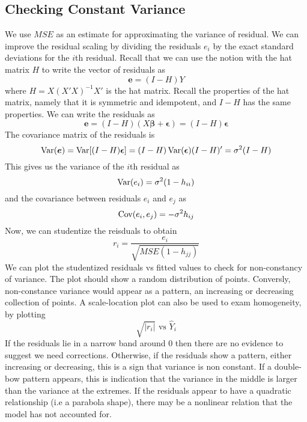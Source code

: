 \subsection{Checking Constant Variance}

We use $MSE$ as an estimate for approximating the variance of residual. We can improve the residual scaling by dividing the residuals $e_i$ by the exact standard deviations for the $i$th residual. Recall that we can use the notion with the hat matrix $H$ to write the vector of residuals as 
\[\boldsymbol{e} = (I-H)Y\]
where $H = X(X'X)^{-1}X'$ is the hat matrix. Recall the properties of the hat matrix, namely that it is symmetric and idempotent, and $I-H$ has the same properties. We can write the residuals as 
\[\boldsymbol{e} = (I-H)(X\boldsymbol{\beta} + \boldsymbol{\epsilon}) = (I-H)\boldsymbol{\epsilon}\]
The covariance matrix of the residuals is 
\[\operatorname{Var}(\boldsymbol{e}) = \operatorname{Var}[(I-H)\boldsymbol{\epsilon}] = (I-H)\operatorname{Var}(\boldsymbol{\epsilon})(I-H)' = \sigma^2(I-H)\]
This gives us the variance of the $i$th residual as
\[\operatorname{Var}(e_i) = \sigma^2(1-h_{ii})\]
and the covariance between residuals $e_i$ and $e_j$ as 
\[\operatorname{Cov}(e_i,e_j) = -\sigma^2h_{ij}\]
Now, we can studentize the reisduals to obtain 
\[r_i = \frac{e_i}{\sqrt{MSE(1-h_{jj})}}\]
We can plot the studentized residuals vs fitted values to check for non-constancy of variance. The plot should show a random distribution of points. Conversly, non-constance variance would appear as a pattern, an increasing or decreasing collection of points. A scale-location plot can also be used to exam homogeneity, by plotting 
\[\sqrt{|r_i|} \text{ vs } \hat{Y}_i\]
If the residuals lie in a narrow band around 0 then there are no evidence to suggest we need corrections. Otherwise, if the residuals show a pattern, either increasing or decreasing, this is a sign that variance is non constant. If a double-bow pattern appears, this is indication that the variance in the middle is larger than the variance at the extremes. If the residuals appear to have a quadratic relationship (i.e a parabola shape), there may be a nonlinear relation that the model has not accounted for.

